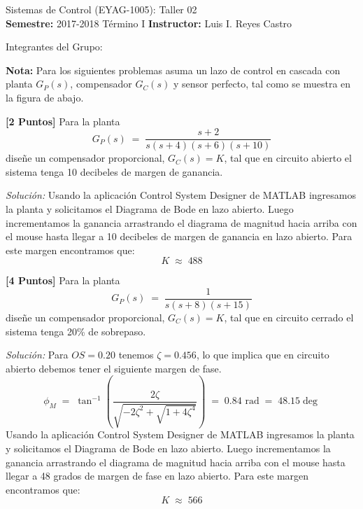 \documentclass[ a4paper, twoside, 11pt]{article}
\newcommand{\numero}{02}
\begin{document}
\allowdisplaybreaks

\begin{center}
\Large Sistemas de Control (EYAG-1005): Taller \numero \\[1ex]
\small \textbf{Semestre:} 2017-2018 T\'ermino I \qquad
\textbf{Instructor:} Luis I. Reyes Castro
\end{center}
\halfskip

Integrantes del Grupo:
\fullskip
\fullskip
\fullskip

\textbf{Nota:} Para los siguientes problemas asuma un lazo de control en cascada con planta $G_P(s)$, compensador $G_C(s)$ y sensor perfecto, tal como se muestra en la figura de abajo. 

\begin{figure}[htb]
\centering
\def\svgwidth{0.8\columnwidth}

\end{figure}
\fullskip

\begin{problem}
\textbf{[2 Puntos]} Para la planta 
\[
G_P(s) \; = \; 
\frac{s+2}{s(s+4)(s+6)(s+10)}
\]
dise\~ne un compensador proporcional, \ie $G_C(s) = K$, tal que en circuito abierto el sistema tenga 10 decibeles de margen de ganancia. 

\emph{Soluci\'on:} Usando la aplicaci\'on Control System Designer de MATLAB ingresamos la planta y solicitamos el Diagrama de Bode en lazo abierto. Luego incrementamos la ganancia arrastrando el diagrama de magnitud hacia arriba con el mouse hasta llegar a 10 decibeles de margen de ganancia en lazo abierto. Para este margen encontramos que: 
\[
K \; \approx \; 488
\]

\end{problem}
\fullskip

\begin{problem}
\textbf{[4 Puntos]} Para la planta 
\[
G_P(s) \; = \; 
\frac{1}{s(s+8)(s+15)}
\]
dise\~ne un compensador proporcional, \ie $G_C(s) = K$, tal que en circuito cerrado el sistema tenga 20\% de sobrepaso. 

\emph{Soluci\'on:} Para $OS = 0.20$ tenemos $\zeta = 0.456$, lo que implica que en circuito abierto debemos tener el siguiente margen de fase. 
\[
\phi_M \; = \; \tan^{-1} \left(
\frac{ 2 \zeta}{ \sqrt{ -2 \zeta^2 + \sqrt{1 + 4 \zeta^4}}}
\right) \; = \; 0.84 \text{ rad} \; = \; 48.15\deg
\]
Usando la aplicaci\'on Control System Designer de MATLAB ingresamos la planta y solicitamos el Diagrama de Bode en lazo abierto. Luego incrementamos la ganancia arrastrando el diagrama de magnitud hacia arriba con el mouse hasta llegar a 48 grados de margen de fase en lazo abierto. Para este margen encontramos que: 
\[
K \; \approx \; 566
\]

\end{problem}
\fullskip
\end{document}
